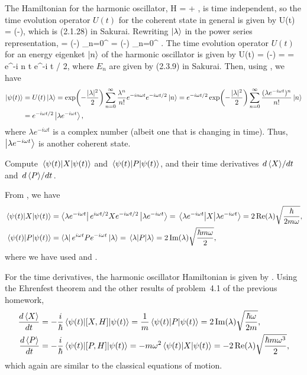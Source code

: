 \begin{solution}
	The Hamiltonian for the harmonic oscillator,
	\beqn \label{ham}
		H =  + ,
	\eeqn
	is time independent, so the time evolution operator $U(t)$ for the coherent state in general is given by
	\beq
		U(t) = \exp(-),
	\eeq
	which is (2.1.28) in Sakurai.  Rewriting $\ket{\lambda}$ in the power series representation,
	\beqn \label{pow}
		\klam = \exp(-) \sum_{n=0}^\infty {} \ko
		= \exp(-) \sum_{n=0}^\infty {} \kn.
	\eeqn
	The time evolution operator $U(t)$ for an energy eigenket $\ket{n}$ of the harmonic oscillator is given by
	\beq
		U(t) \kn = \exp(-) \kn
		=  \kn
		= e^{-i n \omega t} e^{-i \omega t / 2},
	\eeq
	where $E_n$ are given by (2.3.9) in Sakurai.  Then, using , we have
	\begin{align}
		\ket{\psi(t)} &= U(t) \ket{\lambda}
		= \exp(-\frac{|\lambda|^2}{2}) \sum_{n=0}^\infty \frac{\lambda^n}{n!} e^{-i n \omega t} e^{-i \omega t / 2} \ket{n}
		= e^{-i \omega t / 2} \exp(-\frac{|\lambda|^2}{2}) \sum_{n=0}^\infty \frac{(\lambda e^{-i \omega t})^n}{n!} \ket{n} \notag \\
		&= e^{-i \omega t / 2} \ket{\lambda e^{-i \omega t}}, \label{klamt}
	\end{align}
	where $\lambda e^{-i \omega t}$ is a complex number (albeit one that is changing in time).  Thus, $\ket{\lambda e^{-i \omega t}}$ is another coherent state.
\end{solution}

\begin{problem}
	Compute $\ev{X}{\psit}$ and $\ev{P}{\psit}$, and their time derivatives $\dv*{\ev{X}}{t}$ and $\dv*{\ev{P}}{t}$.
\end{problem}

\begin{solution}
	From , we have
	\begin{align*}
		\ev{X}{\psit} &= \blamt e^{i \omega t / 2} X e^{-i \omega t / 2} \klamt = \ev{X}{\lamt} = 2 \Re(\lam) \sqrt{\frac{\hbar}{2 m \omega}}, \\
		\ev{P}{\psit} &= \blam e^{i \omega t} P e^{-i \omega t} \klam = \ev{P}{\lam} = 2 \Im(\lam) \sqrt{\frac{\hbar m \omega}{2}},
	\end{align*}
	where we have used  and .
	
	For the time derivatives, the harmonic oscillator Hamiltonian is given by .  Using the Ehrenfest theorem and the other results of problem~4.1 of the previous homework,
	\begin{align*}
		\dv{\ev{X}}{t} &= -\frac{i}{\hbar} \ev{[X, H]}{\psit} = \frac{1}{m} \ev{P}{\psit} = 2 \Im(\lam) \sqrt{\frac{\hbar \omega}{2 m}}, \\
		\dv{\ev{P}}{t} &= -\frac{i}{\hbar} \ev{[P, H]}{\psit} = - m \omega^2 \ev{X}{\psit} = -2 \Re(\lam) \sqrt{\frac{\hbar m \omega^3}{2}},
	\end{align*}
	which again are similar to the classical equations of motion.
\end{solution}

